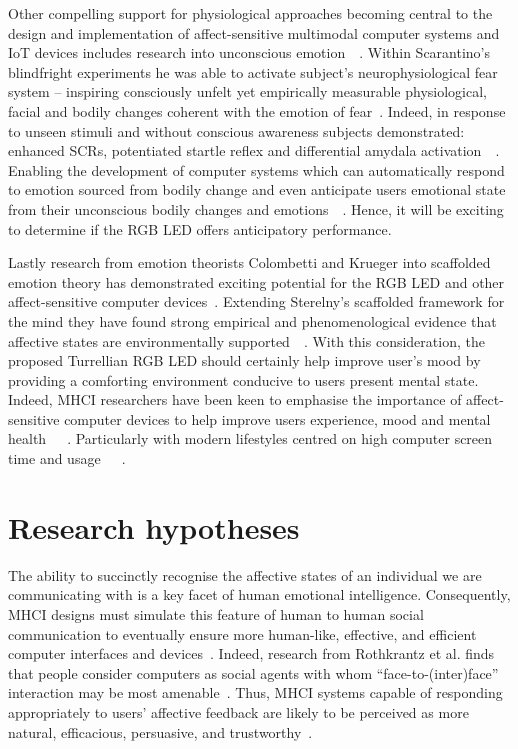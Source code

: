 \documentclass{sigchi}
\begin{document}
Other compelling support for physiological approaches becoming central to the design and implementation of affect-sensitive multimodal computer systems and IoT devices includes research into unconscious emotion~\cite{scarantino2010insights}~\cite{winkielman2004unconscious}. Within Scarantino’s blindfright experiments he was able to activate subject’s neurophysiological fear system – inspiring consciously unfelt yet empirically measurable physiological, facial and bodily changes coherent with the emotion of fear~\cite{scarantino2010insights}. Indeed, in response to unseen stimuli and without conscious awareness subjects demonstrated: enhanced SCRs, potentiated startle reflex and differential amydala activation~\cite{scarantino2010insights}~\cite{winkielman2004unconscious}. Enabling the development of computer systems which can automatically respond to emotion sourced from bodily change and even anticipate users emotional state from their unconscious bodily changes and emotions~\cite{scarantino2010insights}~\cite{smith2016unconscious}. Hence, it will be exciting to determine if the RGB LED offers anticipatory performance.

Lastly research from emotion theorists Colombetti and Krueger into scaffolded emotion theory has demonstrated exciting potential for the RGB LED and other affect-sensitive computer devices~\cite{colombetti2015scaffoldings}. Extending Sterelny’s scaffolded framework for the mind they have found strong empirical and phenomenological evidence that affective states are environmentally supported~\cite{sterelny2010minds}~\cite{sterelny2004externalism}. With this consideration, the proposed Turrellian RGB LED should certainly help improve user’s mood by providing a comforting environment conducive to users present mental state. Indeed, MHCI researchers have been keen to emphasise the importance of affect-sensitive computer devices to help improve users experience, mood and mental health~\cite{5771346}~\cite{fitriani2007multimodal}~\cite{de2013predicting}. Particularly with modern lifestyles centred on high computer screen time and usage~\cite{MedicalNews01}~\cite{MedicalNews02}~\cite{MedicalNews03}. 

\section{Research hypotheses}

The ability to succinctly recognise the affective states of an individual we are communicating with is a key facet of human emotional intelligence. Consequently, MHCI designs must simulate this feature of human to human social communication to eventually ensure more human-like, effective, and efficient computer interfaces and devices~\cite{fitriani2007multimodal}. Indeed, research from Rothkrantz et al. finds that people consider computers as social agents with whom “face-to-(inter)face” interaction may be most amenable~\cite{pantic2003toward}. Thus, MHCI systems capable of responding appropriately to users’ affective feedback are likely to be perceived as more natural, efficacious, persuasive, and trustworthy~\cite{pantic2003toward}.
\end{document}
